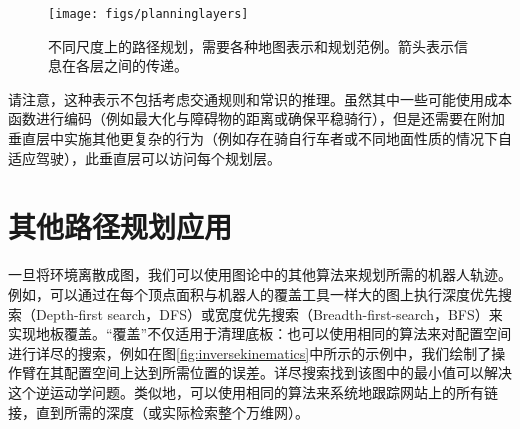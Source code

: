 \begin{figure}
\centering
\texttt{[image: figs/planninglayers]}
\caption{不同尺度上的路径规划，需要各种地图表示和规划范例。箭头表示信息在各层之间的传递。
\label{fig:planninglayers}}
\end{figure}


请注意，这种表示不包括考虑交通规则和常识的推理。虽然其中一些可能使用成本函数进行编码（例如最大化与障碍物的距离或确保平稳骑行），但是还需要在附加垂直层中实施其他更复杂的行为（例如存在骑自行车者或不同地面性质的情况下自适应驾驶），此垂直层可以访问每个规划层。



\section{其他路径规划应用}
一旦将环境离散成图，我们可以使用图论中的其他算法来规划所需的机器人轨迹。例如，可以通过在每个顶点面积与机器人的覆盖工具一样大的图上执行深度优先搜索（Depth-first search，DFS）或宽度优先搜索（Breadth-first-search，BFS）来实现地板覆盖。“覆盖”不仅适用于清理底板：也可以使用相同的算法来对配置空间进行详尽的搜索，例如在图\ref{fig:inversekinematics}中所示的示例中，我们绘制了操作臂在其配置空间上达到所需位置的误差。详尽搜索找到该图中的最小值可以解决这个逆运动学问题。类似地，可以使用相同的算法来系统地跟踪网站上的所有链接，直到所需的深度（或实际检索整个万维网）。

